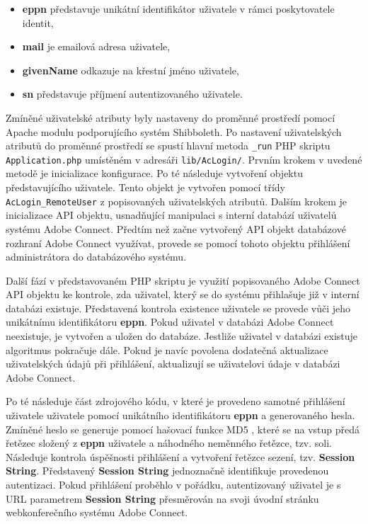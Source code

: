 \documentclass[
  printed, %
  twoside, %
  table,   %
  nolof,     %
  nolot,     %
]{fithesis3}
\begin{document}
\begin{itemize}
    \item \textbf{eppn} představuje unikátní identifikátor uživatele v rámci poskytovatele identit, 
    \item \textbf{mail} je emailová adresa uživatele, 
    \item \textbf{givenName} odkazuje na křestní jméno uživatele,
    \item \textbf{sn} představuje příjmení autentizovaného uživatele.
\end{itemize}
\label{item:adobe-connect}
Zmíněné uživatelské atributy byly nastaveny do proměnné prostředí pomocí Apache modulu podporujícího systém Shibboleth. Po nastavení uživatelských atributů do proměnné prostředí se spustí hlavní metoda \texttt{\_run} PHP skriptu \texttt{Application.php} umístěném v adresáři \texttt{lib/AcLogin/}. Prvním krokem v uvedené metodě je inicializace konfigurace. Po té následuje vytvoření objektu představujícího uživatele. Tento objekt je vytvořen pomocí třídy \texttt{AcLogin\_RemoteUser} z popisovaných uživatelských atributů. Dalším krokem je inicializace API objektu, usnadňující manipulaci s interní databází uživatelů systému Adobe Connect. Předtím než začne vytvořený API objekt databázové rozhraní Adobe Connect využívat, provede se pomocí tohoto objektu přihlášení administrátora do databázového systému. \par 

Další fází v představovaném PHP skriptu je využití popisovaného Adobe Connect API objektu ke kontrole, zda uživatel, který se do systému přihlašuje již v interní databázi existuje. Představená kontrola existence uživatele se provede vůči jeho unikátnímu identifikátoru \textbf{eppn}. Pokud uživatel v databázi Adobe Connect neexistuje, je vytvořen a uložen do databáze. Jestliže uživatel v databázi existuje algoritmus pokračuje dále. Pokud je navíc povolena dodatečná aktualizace uživatelských údajů při přihlášení, aktualizují se uživatelovi údaje v databázi Adobe Connect. \par

Po té následuje část zdrojového kódu, v které je provedeno samotné přihlášení uživatele uživatele pomocí unikátního identifikátoru \textbf{eppn} a generovaného hesla. Zmíněné heslo se generuje pomocí hašovací funkce MD5 \cite{rfc1321}, které se na vstup předá řetězec složený z \textbf{eppn} uživatele a náhodného neměnného řetězce, tzv. soli. Následuje kontrola úspěšnosti přihlášení a vytvoření řetězce sezení, tzv. \textbf{Session String}. Představený \textbf{Session String} jednoznačně identifikuje provedenou autentizaci. Pokud přihlášení proběhlo v pořádku, autentizovaný uživatel je s URL parametrem \textbf{Session String} přesměrován na svoji úvodní stránku webkonferečního systému Adobe Connect.      
\end{document}
